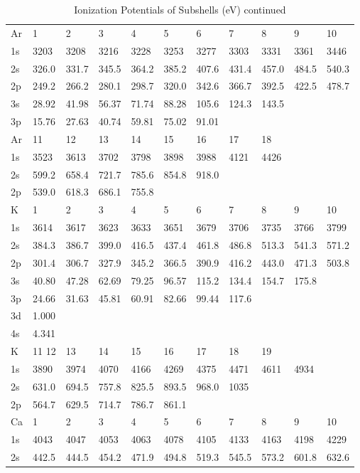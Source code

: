 \begin{table}
\caption{Ionization Potentials of Subshells (eV) continued}
\begin{tabular}{lllllllllll}
\hline
Ar&   1&   2&   3&   4&   5&   6&   7&   8&   9&  10\\
1s& 3203&  3208&  3216&  3228&  3253&
3277&  3303&  3331&  3361&  3446\\
2s& 326.0& 331.7& 345.5& 364.2& 385.2& 407.6& 431.4&
457.0& 484.5& 540.3\\
2p& 249.2& 266.2& 280.1& 298.7& 320.0& 342.6& 366.7& 392.5& 422.5&
478.7\\
3s& 28.92& 41.98& 56.37& 71.74& 88.28& 105.6& 124.3& 143.5\\
3p& 15.76& 27.63& 40.74&
59.81& 75.02& 91.01\\
\hline
Ar&  11&  12&  13&  14&  15&  16&  17& 18\\
\hline
1s& 3523& 3613& 3702&
3798&  3898&  3988&  4121&  4426\\
2s& 599.2& 658.4& 721.7& 785.6& 854.8& 918.0\\
2p& 539.0&
618.3& 686.1& 755.8\\
\hline
K&    1&   2&   3&   4&   5&   6&   7&   8&   9&  10\\
\hline
1s&  3614&  3617&
3623&  3633&  3651&  3679&  3706&  3735&  3766& 3799\\
2s& 384.3& 386.7& 399.0& 416.5&
437.4& 461.8& 486.8& 513.3& 541.3& 571.2\\
2p& 301.4& 306.7& 327.9& 345.2& 366.5& 390.9&
416.2& 443.0& 471.3& 503.8\\
3s& 40.80& 47.28& 62.69& 79.25& 96.57& 115.2& 134.4& 154.7&
175.8\\
3p& 24.66& 31.63& 45.81& 60.91& 82.66& 99.44& 117.6\\
3d& 1.000\\
4s& 4.341\\
\hline
K&   11
12&  13&  14&  15&  16&  17&  18&  19\\
\hline
1s&  3890&  3974&  4070&  4166&  4269&  4375&  4471&
4611&  4934\\
2s& 631.0& 694.5& 757.8& 825.5& 893.5& 968.0&  1035\\
2p& 564.7& 629.5& 714.7&
786.7& 861.1\\
\hline
Ca&   1&   2&   3&   4&   5&   6&   7&   8&   9&  10\\
\hline
1s&  4043&  4047&  4053&
4063&  4078&  4105&  4133&  4163&  4198&  4229\\
2s& 442.5& 444.5& 454.2& 471.9& 494.8&
519.3& 545.5& 573.2& 601.8& 632.6\\

\end{tabular}
\end{table}
